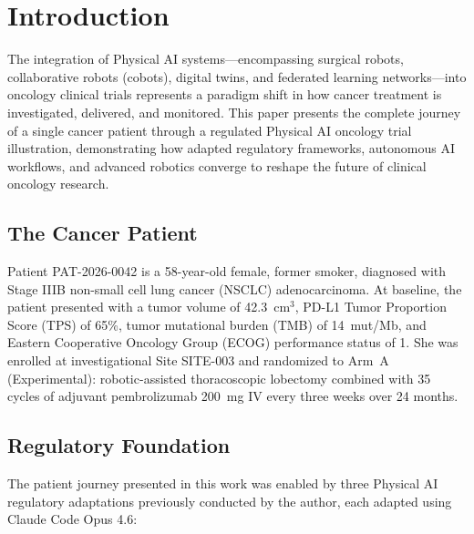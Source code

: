\documentclass{article}
\begin{document}

\section{Introduction}
\label{sec:introduction}

\vspace{-0.2cm}

The integration of Physical AI systems---encompassing surgical robots, collaborative robots (cobots), digital twins, and federated learning networks---into oncology clinical trials represents a paradigm shift in how cancer treatment is investigated, delivered, and monitored. This paper presents the complete journey of a single cancer patient through a regulated Physical AI oncology trial illustration, demonstrating how adapted regulatory frameworks, autonomous AI workflows, and advanced robotics converge to reshape the future of clinical oncology research.

\vspace{-0.1cm}

\subsection{The Cancer Patient}

Patient PAT-2026-0042 is a 58-year-old female, former smoker, diagnosed with Stage IIIB non-small cell lung cancer (NSCLC) adenocarcinoma. At baseline, the patient presented with a tumor volume of 42.3~cm$^3$, PD-L1 Tumor Proportion Score (TPS) of 65\%, tumor mutational burden (TMB) of 14~mut/Mb, and Eastern Cooperative Oncology Group (ECOG) performance status of 1. She was enrolled at investigational Site SITE-003 and randomized to Arm~A (Experimental): robotic-assisted thoracoscopic lobectomy combined with 35 cycles of adjuvant pembrolizumab 200~mg IV every three weeks over 24 months.

\vspace{-0.1cm}

\subsection{Regulatory Foundation}

The patient journey presented in this work was enabled by three Physical AI regulatory adaptations previously conducted by the author, each adapted using Claude Code Opus 4.6:
\end{document}
